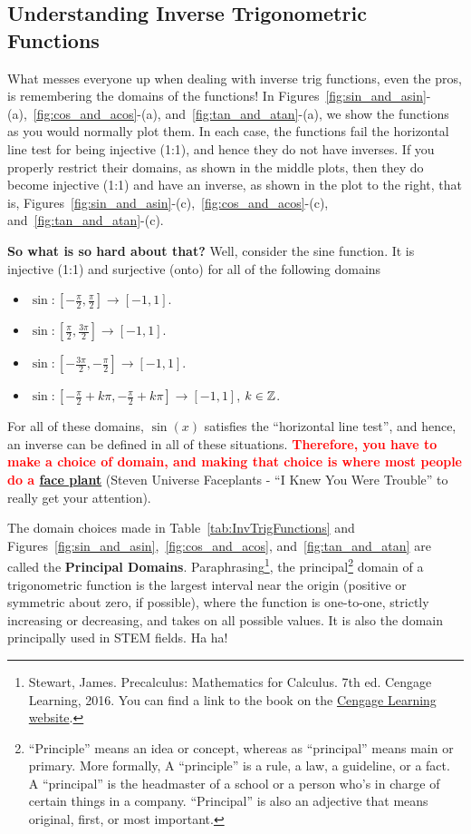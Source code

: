 \subsection{Understanding Inverse Trigonometric Functions}

What messes everyone up when dealing with inverse trig functions, even the pros, is remembering the domains of the functions! In Figures~\ref{fig:sin_and_asin}-(a),~\ref{fig:cos_and_acos}-(a), and~\ref{fig:tan_and_atan}-(a), we show the functions as you would normally plot them. In each case, the functions fail the horizontal line test for being injective (1:1), and hence they do not have inverses. If you properly restrict their domains, as shown in the middle plots, then they do become injective (1:1) and have an inverse, as shown in the plot to the right, that is, Figures~\ref{fig:sin_and_asin}-(c),~\ref{fig:cos_and_acos}-(c), and~\ref{fig:tan_and_atan}-(c). 

\textbf{So what is so hard about that?} Well, consider the sine function. It is injective (1:1) and surjective (onto) for all of the following domains
\begin{itemize}
    \item $\sin:[-\frac{\pi}{2}, \frac{\pi}{2}] \to [-1, 1]$.
    \item $\sin:[\frac{\pi}{2}, \frac{3\pi}{2}] \to [-1, 1]$.
    \item $\sin:[-\frac{3\pi}{2}, -\frac{\pi}{2}] \to [-1, 1]$.
    \item $\sin:[-\frac{\pi}{2} + k \pi, -\frac{\pi}{2}+k \pi] \to [-1, 1]$, $k \in \mathbb Z$.
\end{itemize}
For all of these domains, $\sin(x)$ satisfies the ``horizontal line test'', and hence, an inverse can be defined in all of these situations. \textcolor{red}{\bf Therefore, you have to make a choice of domain, and making that choice is where most people do a \href{https://www.youtube.com/watch?v=E2zD2bg4eh8}{face plant}} (Steven Universe Faceplants - ``I Knew You Were Trouble'' to really get your attention). 

The domain choices made in Table~\ref{tab:InvTrigFunctions} and Figures~\ref{fig:sin_and_asin},~\ref{fig:cos_and_acos}, and~\ref{fig:tan_and_atan} are called the \textbf{Principal Domains}. Paraphrasing\footnote{ Stewart, James. Precalculus: Mathematics for Calculus. 7th ed. Cengage Learning, 2016. You can find a link to the book on the  \href{https://www.cengage.com/c/precalculus-10e-larson/9781337271073/}{Cengage Learning website}.}, the principal\footnote{``Principle'' means an idea or concept, whereas as ``principal'' means main or primary. More formally, A ``principle'' is a rule, a law, a guideline, or a fact. A ``principal'' is the headmaster of a school or a person who's in charge of certain things in a company. ``Principal'' is also an adjective that means original, first, or most important.} domain of a trigonometric function is the largest interval near the origin (positive or symmetric about zero, if possible), where the function is one-to-one, strictly increasing or decreasing, and takes on all possible values. It is also the domain principally used in STEM fields. Ha ha!  


